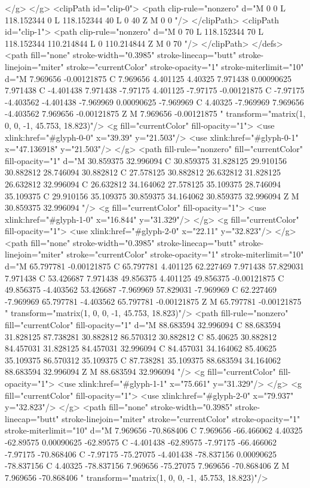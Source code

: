 </g>
</g>
<clipPath id="clip-0">
<path clip-rule="nonzero" d="M 0 0 L 118.152344 0 L 118.152344 40 L 0 40 Z M 0 0 "/>
</clipPath>
<clipPath id="clip-1">
<path clip-rule="nonzero" d="M 0 70 L 118.152344 70 L 118.152344 110.214844 L 0 110.214844 Z M 0 70 "/>
</clipPath>
</defs>
<path fill="none" stroke-width="0.3985" stroke-linecap="butt" stroke-linejoin="miter" stroke="currentColor" stroke-opacity="1" stroke-miterlimit="10" d="M 7.969656 -0.00121875 C 7.969656 4.401125 4.40325 7.971438 0.00090625 7.971438 C -4.401438 7.971438 -7.97175 4.401125 -7.97175 -0.00121875 C -7.97175 -4.403562 -4.401438 -7.969969 0.00090625 -7.969969 C 4.40325 -7.969969 7.969656 -4.403562 7.969656 -0.00121875 Z M 7.969656 -0.00121875 " transform="matrix(1, 0, 0, -1, 45.753, 18.823)"/>
<g fill="currentColor" fill-opacity="1">
<use xlink:href="#glyph-0-0" x="39.39" y="21.503"/>
<use xlink:href="#glyph-0-1" x="47.136918" y="21.503"/>
</g>
<path fill-rule="nonzero" fill="currentColor" fill-opacity="1" d="M 30.859375 32.996094 C 30.859375 31.828125 29.910156 30.882812 28.746094 30.882812 C 27.578125 30.882812 26.632812 31.828125 26.632812 32.996094 C 26.632812 34.164062 27.578125 35.109375 28.746094 35.109375 C 29.910156 35.109375 30.859375 34.164062 30.859375 32.996094 Z M 30.859375 32.996094 "/>
<g fill="currentColor" fill-opacity="1">
<use xlink:href="#glyph-1-0" x="16.844" y="31.329"/>
</g>
<g fill="currentColor" fill-opacity="1">
<use xlink:href="#glyph-2-0" x="22.11" y="32.823"/>
</g>
<path fill="none" stroke-width="0.3985" stroke-linecap="butt" stroke-linejoin="miter" stroke="currentColor" stroke-opacity="1" stroke-miterlimit="10" d="M 65.797781 -0.00121875 C 65.797781 4.401125 62.227469 7.971438 57.829031 7.971438 C 53.426687 7.971438 49.856375 4.401125 49.856375 -0.00121875 C 49.856375 -4.403562 53.426687 -7.969969 57.829031 -7.969969 C 62.227469 -7.969969 65.797781 -4.403562 65.797781 -0.00121875 Z M 65.797781 -0.00121875 " transform="matrix(1, 0, 0, -1, 45.753, 18.823)"/>
<path fill-rule="nonzero" fill="currentColor" fill-opacity="1" d="M 88.683594 32.996094 C 88.683594 31.828125 87.738281 30.882812 86.570312 30.882812 C 85.40625 30.882812 84.457031 31.828125 84.457031 32.996094 C 84.457031 34.164062 85.40625 35.109375 86.570312 35.109375 C 87.738281 35.109375 88.683594 34.164062 88.683594 32.996094 Z M 88.683594 32.996094 "/>
<g fill="currentColor" fill-opacity="1">
<use xlink:href="#glyph-1-1" x="75.661" y="31.329"/>
</g>
<g fill="currentColor" fill-opacity="1">
<use xlink:href="#glyph-2-0" x="79.937" y="32.823"/>
</g>
<path fill="none" stroke-width="0.3985" stroke-linecap="butt" stroke-linejoin="miter" stroke="currentColor" stroke-opacity="1" stroke-miterlimit="10" d="M 7.969656 -70.868406 C 7.969656 -66.466062 4.40325 -62.89575 0.00090625 -62.89575 C -4.401438 -62.89575 -7.97175 -66.466062 -7.97175 -70.868406 C -7.97175 -75.27075 -4.401438 -78.837156 0.00090625 -78.837156 C 4.40325 -78.837156 7.969656 -75.27075 7.969656 -70.868406 Z M 7.969656 -70.868406 " transform="matrix(1, 0, 0, -1, 45.753, 18.823)"/>

